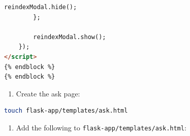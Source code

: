 \documentclass[
  screen,review,acmlarge]{acmart}
\newcommand{\passthrough}[1]{#1}
\providecommand{\tightlist}{%
  \setlength{\itemsep}{0pt}\setlength{\parskip}{0pt}}
\begin{document}
\begin{lstlisting}[language=HTML]
            reindexModal.hide();
        };
        
        reindexModal.show();
    });
</script>
{% endblock %}
{% endblock %}
\end{lstlisting}

\begin{enumerate}
\def\labelenumi{\arabic{enumi}.}
\setcounter{enumi}{10}
\tightlist
\item
  Create the ask page:
\end{enumerate}

\begin{lstlisting}[language=bash]
touch flask-app/templates/ask.html
\end{lstlisting}

\begin{enumerate}
\def\labelenumi{\arabic{enumi}.}
\setcounter{enumi}{11}
\tightlist
\item
  Add the following to \passthrough{\lstinline!flask-app/templates/ask.html!}:
\end{enumerate}
\end{document}
